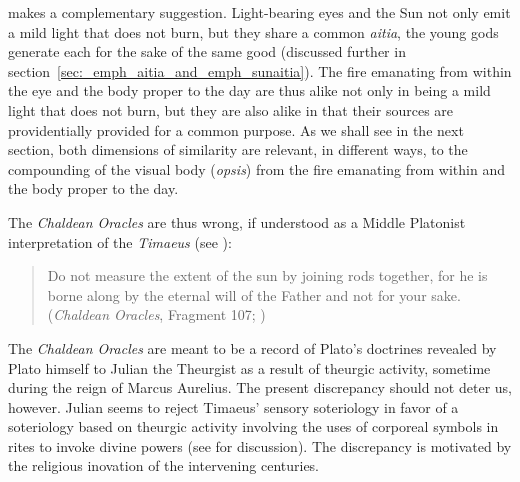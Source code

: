 \citet[112]{Johansen:2004dx} makes a complementary suggestion. Light-bearing eyes and the Sun not only emit a mild light that does not burn, but they share a common \emph{aitia}, the young gods generate each for the sake of the same good (discussed further in section~\ref{sec:_emph_aitia_and_emph_sunaitia}). The fire emanating from within the eye and the body proper to the day are thus alike not only in being a mild light that does not burn, but they are also alike in that their sources are providentially provided for a common purpose. As we shall see in the next section, both dimensions of similarity are relevant, in different ways, to the compounding of the visual body (\emph{opsis}) from the fire emanating from within and the body proper to the day.

The \emph{Chaldean Oracles} are thus wrong, if understood as a Middle Platonist interpretation of the \emph{Timaeus} (see \citealt{Brisson:2003aa}):
\begin{quote}
	Do not measure the extent of the sun by joining rods together, for he is borne along by the eternal will of the Father and not for your sake. (\emph{Chaldean Oracles}, Fragment 107; \citealt[89--91]{Majercik:2013jw})
\end{quote} 
The \emph{Chaldean Oracles} are meant to be a record of Plato's doctrines revealed by Plato himself to Julian the Theurgist as a result of theurgic activity, sometime during the reign of Marcus Aurelius. The present discrepancy should not deter us, however. Julian seems to reject Timaeus' sensory soteriology in favor of a soteriology based on theurgic activity involving the uses of corporeal symbols in rites to invoke divine powers (see \citealt[21--25]{Majercik:2013jw} for discussion). The discrepancy is motivated by the religious inovation of the intervening centuries.

